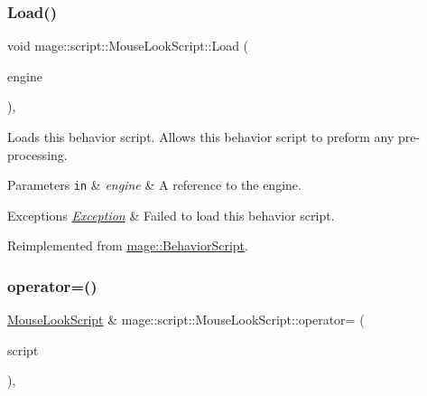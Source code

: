 \hypertarget{classmage_1_1script_1_1_mouse_look_script_a00c8dc8ebaf67da13bd0bc45de3ad8b6}{}\label{classmage_1_1script_1_1_mouse_look_script_a00c8dc8ebaf67da13bd0bc45de3ad8b6} 
\subsubsection{\texorpdfstring{Load()}{Load()}}
{\footnotesize\ttfamily void mage\+::script\+::\+Mouse\+Look\+Script\+::\+Load (\begin{DoxyParamCaption}\item[{\mbox{[}\mbox{[}maybe\+\_\+unused\mbox{]} \mbox{]} \hyperlink{classmage_1_1_engine}{Engine} \&}]{engine }\end{DoxyParamCaption})\hspace{0.3cm}{\ttfamily [override]}, {\ttfamily [virtual]}}

Loads this behavior script. Allows this behavior script to preform any pre-\/processing.


\begin{DoxyParams}[1]{Parameters}
\mbox{\tt in}  & {\em engine} & A reference to the engine. \\
\hline
\end{DoxyParams}

\begin{DoxyExceptions}{Exceptions}
{\em \hyperlink{classmage_1_1_exception}{Exception}} & Failed to load this behavior script. \\
\hline
\end{DoxyExceptions}


Reimplemented from \hyperlink{classmage_1_1_behavior_script_ae7864876b2ffb1d1d8d8a56e3099f1f2}{mage\+::\+Behavior\+Script}.

\hypertarget{classmage_1_1script_1_1_mouse_look_script_a08731370926cbaee931170fd3fb108e6}{}\label{classmage_1_1script_1_1_mouse_look_script_a08731370926cbaee931170fd3fb108e6} 
\subsubsection{\texorpdfstring{operator=()}{operator=()}\hspace{0.1cm}{\footnotesize\ttfamily [1/2]}}
{\footnotesize\ttfamily \hyperlink{classmage_1_1script_1_1_mouse_look_script}{Mouse\+Look\+Script} \& mage\+::script\+::\+Mouse\+Look\+Script\+::operator= (\begin{DoxyParamCaption}\item[{const \hyperlink{classmage_1_1script_1_1_mouse_look_script}{Mouse\+Look\+Script} \&}]{script }\end{DoxyParamCaption})\hspace{0.3cm}{\ttfamily [default]}, {\ttfamily [noexcept]}}

